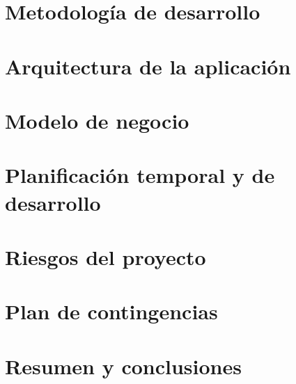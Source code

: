 \documentclass[runningheads]{llncs}
\begin{document}
\section{Metodología de desarrollo}

\section{Arquitectura de la aplicación}

\section{Modelo de negocio}

\section{Planificación temporal y de desarrollo}

\section{Riesgos del proyecto}

\section{Plan de contingencias}

\section{Resumen y conclusiones}
\end{document}
